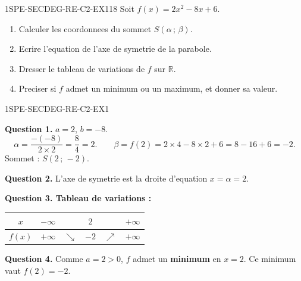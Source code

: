


\begin{exercice}{1SPE-SECDEG-RE-C2-EX1}{1}{8}
Soit $f(x) = 2x^2 - 8x + 6$.
\begin{enumerate}
  \item Calculer les coordonnees du sommet $S(\alpha\,;\,\beta)$.
  \item Ecrire l'equation de l'axe de symetrie de la parabole.
  \item Dresser le tableau de variations de $f$ sur $\mathbb{R}$.
  \item Preciser si $f$ admet un minimum ou un maximum, et donner sa valeur.
\end{enumerate}
\end{exercice}


\begin{corrige}{1SPE-SECDEG-RE-C2-EX1}


\textbf{Question 1.} $a = 2$, $b = -8$.
\[
\alpha = \frac{-(-8)}{2 \times 2} = \frac{8}{4} = 2. \qquad
\beta = f(2) = 2 \times 4 - 8 \times 2 + 6 = 8 - 16 + 6 = -2.
\]
Sommet : $S(2\,;\,-2)$.

\textbf{Question 2.} L'axe de symetrie est la droite d'equation $x = \alpha = 2$.

\textbf{Question 3. Tableau de variations :}

\begin{center}
\begin{tabular}{|c|ccccc|}
\hline
$x$ & $-\infty$ & & $2$ & & $+\infty$ \\
\hline
$f(x)$ & $+\infty$ & $\searrow$ & $-2$ & $\nearrow$ & $+\infty$ \\
\hline
\end{tabular}
\end{center}

\textbf{Question 4.} Comme $a = 2 > 0$, $f$ admet un \textbf{minimum} en $x = 2$. Ce minimum vaut $f(2) = -2$.

\end{corrige}

